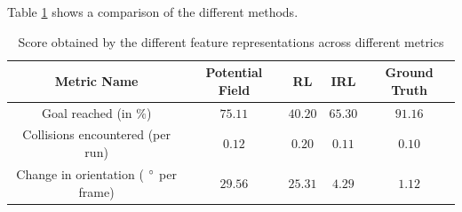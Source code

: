 
Table \ref{tab:inter_method_numerical_results} shows a comparison of the different methods.
\begin{table}[htbp]
	\begin{center}
		\renewcommand{\arraystretch}{1.3}
		\begin{tabular}{|c|c|c|c|c|}
			\hline
			\textbf{Metric Name} & \textbf{Potential Field} & \textbf{RL} & \textbf{IRL}  &  \textbf{Ground Truth} \\
			\hline
			Goal reached (in $\%$) & $75.11$ & $40.20$ & $65.30$ & $91.16$\\
			Collisions encountered (per run) & $ 0.12$ & $0.20$ & $0.11$ & $0.10$\\
			Change in orientation ( $\degree$ per frame) & $29.56$ & $25.31$ &  $4.29$ & $1.12$ \\
			\hline
		\end{tabular}
	\end{center}
	\caption{Score obtained by the different feature representations across different metrics}
	\label{tab:inter_method_numerical_results}
\end{table}\\
